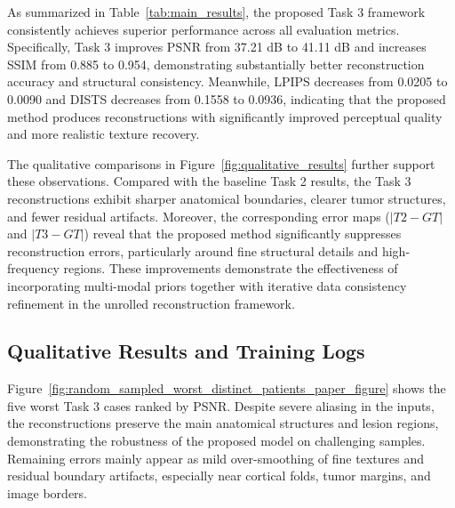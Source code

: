 As summarized in Table~\ref{tab:main_results}, the proposed Task 3 framework consistently achieves superior performance across all evaluation metrics. Specifically, Task 3 improves PSNR from 37.21 dB to 41.11 dB and increases SSIM from 0.885 to 0.954, demonstrating substantially better reconstruction accuracy and structural consistency. Meanwhile, LPIPS decreases from 0.0205 to 0.0090 and DISTS decreases from 0.1558 to 0.0936, indicating that the proposed method produces reconstructions with significantly improved perceptual quality and more realistic texture recovery.

The qualitative comparisons in Figure~\ref{fig:qualitative_results} further support these observations. Compared with the baseline Task 2 results, the Task 3 reconstructions exhibit sharper anatomical boundaries, clearer tumor structures, and fewer residual artifacts. Moreover, the corresponding error maps ($|T2-GT|$ and $|T3-GT|$) reveal that the proposed method significantly suppresses reconstruction errors, particularly around fine structural details and high-frequency regions. These improvements demonstrate the effectiveness of incorporating multi-modal priors together with iterative data consistency refinement in the unrolled reconstruction framework.

\begin{table}[h]
\centering
\caption{Quantitative comparison between Task 2 (Baseline) and Task 3 (Multi-modal Unrolled Network).}
\label{tab:main_results}
\end{table}

\subsection{Qualitative Results and Training Logs}

Figure~\ref{fig:random_sampled_worst_distinct_patients_paper_figure} shows the five worst Task 3 cases ranked by PSNR. Despite severe aliasing in the inputs, the reconstructions preserve the main anatomical structures and lesion regions, demonstrating the robustness of the proposed model on challenging samples. Remaining errors mainly appear as mild over-smoothing of fine textures and residual boundary artifacts, especially near cortical folds, tumor margins, and image borders.

